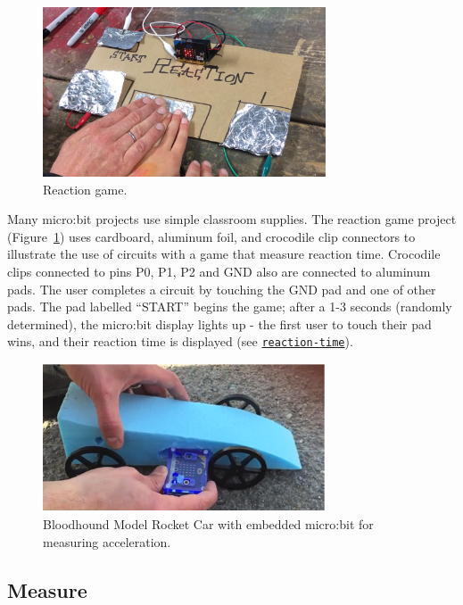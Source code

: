 

\begin{figure}[t]
    \includegraphics[width=3.3in]{images/reaction.jpg} 
    \caption{\label{fig:reaction}Reaction game.}
\end{figure}

Many micro:bit projects use simple classroom supplies. The reaction
game project (Figure~\ref{fig:reaction}) uses cardboard, aluminum foil, 
and crocodile clip connectors to illustrate the use of circuits with a game
that measure reaction time. Crocodile
clips connected to pins P0, P1, P2 and GND also are connected to aluminum
pads. The user completes a circuit by touching the GND pad and one of
other pads. The pad labelled ``START'' begins the game; after a 1-3
seconds (randomly determined), the micro:bit display lights up - the first
user to touch their pad wins, and their reaction time is displayed
(see {\tt \href{http://makecode.microbit.org/projects/reaction-time}{reaction-time}}).

\begin{figure}[t]
    \includegraphics[width=3.3in]{images/rocketcar.png} 
    \caption{\label{fig:rocketcar}Bloodhound Model Rocket Car with embedded micro:bit for
    measuring acceleration.}
\end{figure}

\subsection{Measure}


